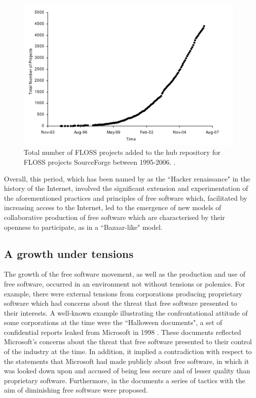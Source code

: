 \begin{figure}[H]
	\centering
	\includegraphics[scale=0.6]{img/total_number_of_oss_projects.png}
	\caption[Total number of FLOSS projects added to Sourceforge (1995-2006)]%
	{Total number of FLOSS projects added to the hub repository for FLOSS projects SourceForge between 1995-2006. \textcite{deshpande2008total}.}
	 \label{stats-total-oss}
\end{figure}

Overall, this period, which has been named by \textcite[111]{ryan2010history} as the ``Hacker renaissance" in the history of the Internet,  involved the significant extension and experimentation of the aforementioned practices and principles of free software which, facilitated by increasing access to the Internet, led to the emergence of new models of collaborative production of free software which are characterised by their openness to participate, as in a ``Bazaar-like" model. 

\subsection{A growth under tensions}

The growth of the free software movement, as well as the production and use of free software, occurred in an environment not without tensions or polemics. For example, there were external tensions from corporations producing proprietary software which had concerns about the threat that free software presented to their interests. A well-known example illustrating the confrontational attitude of some corporations at the time were the ``Halloween documents", a set of confidential reports leaked from Microsoft in 1998 \parencite{halloween:Online}. These documents reflected Microsoft's concerns about the threat that free software presented to their control of the industry at the time. In addition, it implied a contradiction with respect to the statements that Microsoft had made publicly about free software, in which it was looked down upon and accused of being less secure and of lesser quality than proprietary software. Furthermore, in the documents a series of tactics with the aim of diminishing free software were proposed.

